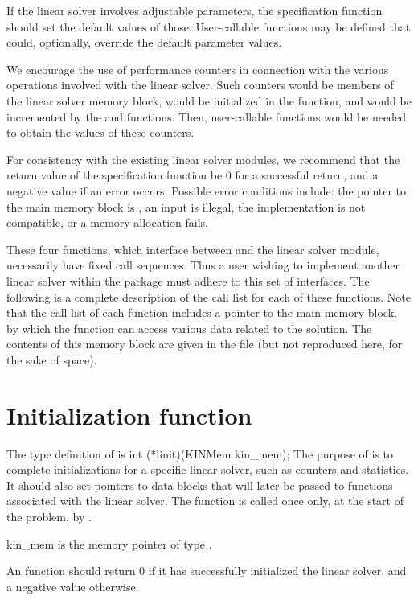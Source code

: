 If the linear solver involves adjustable parameters, the specification
function should set the default values of those.  User-callable
functions may be defined that could, optionally, override the default
parameter values.

We encourage the use of performance counters in connection with the various
operations involved with the linear solver.  Such counters would be
members of the linear solver memory block, would be initialized in the
 function, and would be incremented by the  and
 functions.  Then, user-callable functions would be needed to
obtain the values of these counters.

For consistency with the existing {\kinsol} linear solver modules, we
recommend that the return value of the specification function be 0 for
a successful return, and a negative value if an error occurs.
Possible error conditions include: the pointer to the main {\kinsol}
memory block is , an input is illegal, the {\nvector}
implementation is not compatible, or a memory allocation fails.

\vspace{0.1in}
These four functions, which interface between {\kinsol} and the linear solver module,
necessarily have fixed call sequences.  Thus a user wishing to implement another 
linear solver within the {\kinsol} package must adhere to this set of interfaces.
The following is a complete description of the call list for each of
these functions.  Note that the call list of each function includes a
pointer to the main {\kinsol} memory block, by which the function can access
various data related to the {\kinsol} solution.  The contents of this memory
block are given in the file  (but not reproduced here, for
the sake of space).


\section{Initialization function}
The type definition of  is
{
  int (*linit)(KINMem kin\_mem);
}
{
  The purpose of  is to complete initializations for      
  a specific linear solver, such as counters and statistics.        
  It should also set pointers to data blocks that will later be
  passed to functions associated with the linear solver.
  The  function is called once only, at the start of
  the problem, by .
}
{
  \begin{args}
  \item[kin\_mem]
    is the {\kinsol} memory pointer of type .
  \end{args}
}
{
  An  function should return 0 if it 
  has successfully initialized the {\kinsol} linear solver, and 
  a negative value otherwise. 
}
{}

